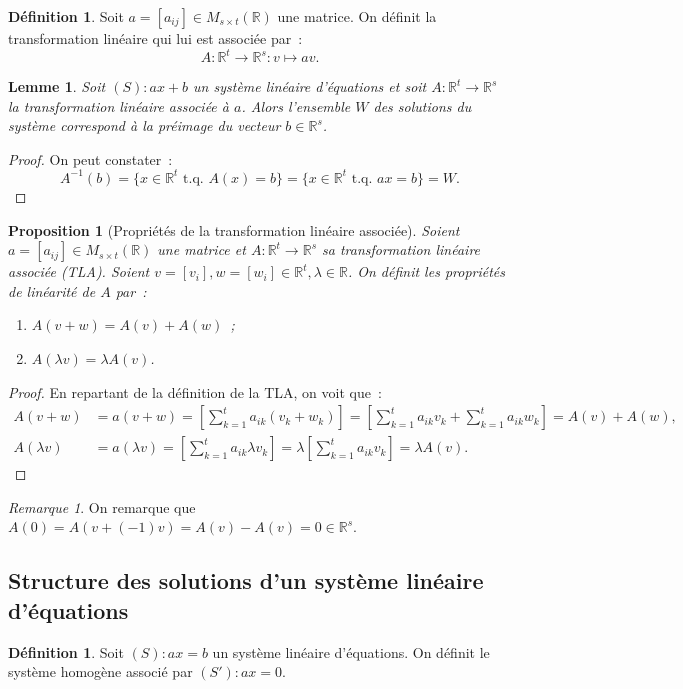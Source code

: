 \documentclass{article}
\newcommand{\R}{\mathbb R}
\newcommand{\M}[3]{M_{#1 \times #2}(#3)}
\newcommand{\tq}{\textrm{ t.q. }}
\newtheorem{prp}[thm]{Proposition}
\newtheorem{lem}[thm]{Lemme}
\theoremstyle{definition}
\newtheorem{déf}[thm]{Définition}
\theoremstyle{remark}
\newtheorem*{rmq}{Remarque}
\begin{document}
		\begin{déf} Soit $a = [a_{ij}] \in \M st\R$ une matrice. On définit la transformation linéaire qui lui est associée par~:
		\[A : \R^t \to \R^s : v \mapsto av.\] \end{déf}

		\begin{lem} Soit $(S) : ax + b$ un système linéaire d'équations et soit $A : \R^t \to \R^s$ la transformation linéaire associée à $a$. Alors l'ensemble $W$ des
		solutions du système correspond à la préimage du vecteur $b \in \R^s$. \end{lem}

		\begin{proof} On peut constater~: \[A^{-1}(b) = \{x \in \R^t \tq A(x) = b\} = \{x \in \R^t \tq ax = b\} = W.\] \end{proof}

		\begin{prp}[Propriétés de la transformation linéaire associée] Soient $a = [a_{ij}] \in \M st\R$ une matrice et $A : \R^t \to \R^s$ sa transformation
		linéaire associée (TLA). Soient $v = [v_i], w = [w_i] \in \R^t, \lambda \in \R$. On définit les propriétés de linéarité de $A$ par~:
		\begin{enumerate}
			\item $A(v+w) = A(v) + A(w)$~;
			\item $A(\lambda v) = \lambda A(v)$.
		\end{enumerate}
		\end{prp}

		\begin{proof} En repartant de la définition de la TLA, on voit que~:
		\begin{align*}
			A(v+w) &= a(v+w) = \left[\sum_{k=1}^ta_{ik}(v_k+w_k)\right] = \left[\sum_{k=1}^ta_{ik}v_k+\sum_{k=1}^ta_{ik}w_k\right] = A(v) + A(w), \\
			A(\lambda v) &= a(\lambda v) = \left[\sum_{k=1}^ta_{ik}\lambda v_k\right] = \lambda \left[\sum_{k=1}^ta_{ik}v_k\right] = \lambda A(v).
		\end{align*}
		\end{proof}

		\begin{rmq} On remarque que $A(0) = A(v + (-1)v) = A(v) - A(v) = 0 \in \R^s$. \end{rmq}

	\subsection{Structure des solutions d'un système linéaire d'équations}
		\begin{déf} Soit $(S) : ax = b$ un système linéaire d'équations. On définit le système homogène associé par $(S') : ax = 0$. \end{déf}
\end{document}
